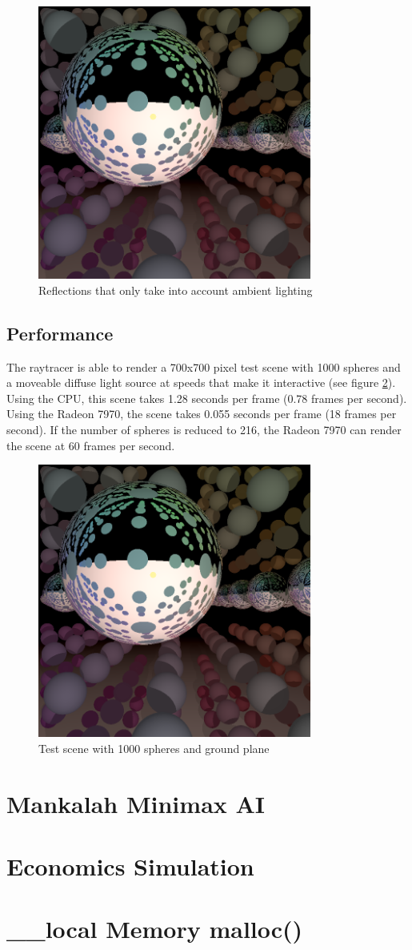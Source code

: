 \documentclass{article}
\begin{document}
\begin{figure}[ht!]
\centering
\includegraphics[width=90mm]{reflections.png}
\caption{Reflections that only take into account ambient lighting}
\label{fig:reflections}
\end{figure}

\subsection{Performance}
The raytracer is able to render a 700x700 pixel test scene with 1000 spheres and a moveable diffuse light source at speeds that make it interactive (see figure \ref{fig:testscene}). Using the CPU, this scene takes 1.28 seconds per frame (0.78 frames per second). Using the Radeon 7970, the scene takes 0.055 seconds per frame (18 frames per second). If the number of spheres is reduced to 216, the Radeon 7970 can render the scene at 60 frames per second.

\begin{figure}[ht!]
\centering
\includegraphics[width=90mm]{reflections.png}
\caption{Test scene with 1000 spheres and ground plane}
\label{fig:testscene}
\end{figure}

\section{Mankalah Minimax AI}


\section{Economics Simulation}


\section{\_\_local Memory malloc()}
\end{document}
